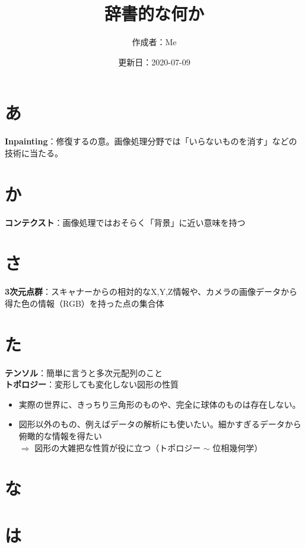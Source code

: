 \documentclass[a4paper,10pt,titlepage]{jsarticle}
\title{辞書的な何か}
\date{更新日：2020-07-09}
\author{作成者：Me}
\begin{document}
\maketitle

\section{あ}

\textbf{Inpainting}：修復するの意。画像処理分野では「いらないものを消す」などの技術に当たる。\\

\section{か}

\textbf{コンテクスト}：画像処理ではおそらく「背景」に近い意味を持つ

\section{さ}

\textbf{3次元点群}：スキャナーからの相対的なX,Y,Z情報や、カメラの画像データから得た色の情報（RGB）を持った点の集合体

\section{た}

\textbf{テンソル}：簡単に言うと多次元配列のこと\\
\quad \textbf{トポロジー}：変形しても変化しない図形の性質
\begin{itemize}
  \item 実際の世界に、きっちり三角形のものや、完全に球体のものは存在しない。
  \item 図形以外のもの、例えばデータの解析にも使いたい。細かすぎるデータから俯瞰的な情報を得たい\\
  $\Rightarrow$ 図形の大雑把な性質が役に立つ（トポロジー $\sim$ 位相幾何学）
\end{itemize}

\section{な}

\section{は}
\end{document}
